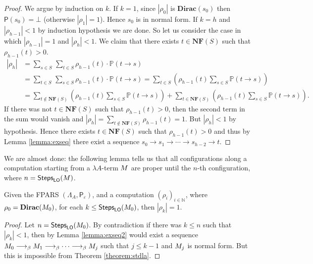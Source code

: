 \begin{proof}
	We argue by induction on $k$. If $k=1$, since $|\rho_0|$ is $\mathbf{Dirac}(s_0)$ then $\mathsf{P}(s_0)=\bot$ (otherwise $|\rho_1|=1$). Hence $s_0$ is in normal form. If $k=h$ and $|\rho_{h-1}|<1$ by induction hypothesis we are done. So let us consider the case in which $|\rho_{h-1}|=1$ and $|\rho_h|<1$. We claim that there exists $t\in \mathbf{NF}(S)$ such that $\rho_{h-1}(t)>0$.
	\begin{align*}
	|\rho_h|&=\underset{s\in S}{\sum}\,\underset{t\in S}{\sum}\rho_{h-1}(t) \cdot\mathbb{P}\left(t \rightarrow s\right)\\
	&=\underset{t\in S}{\sum}\,\underset{s\in S}{\sum}\rho_{h-1}(t) \cdot\mathbb{P}\left(t \rightarrow s\right)=\underset{t\in S}{\sum}\left(\rho_{h-1}(t)\underset{s\in S}{\sum}\mathbb{P}\left(t \rightarrow s\right) \right)\\
	&=\underset{t\not\in \mathbf{NF}(S)}{\sum}\left(\rho_{h-1}(t)\underset{s\in S}{\sum}\mathbb{P}\left(t \rightarrow s\right) \right)+\underset{t\in \mathbf{NF}(S)}{\sum}\left(\rho_{h-1}(t)\underset{s\in S}{\sum}\mathbb{P}\left(t \rightarrow s\right) \right).
	\end{align*}
	If there was not $t\in \mathbf{NF}(S)$ such that $\rho_{h-1}(t)>0$, then the second term in the sum would vanish and
	$|\rho_h|=\underset{t\not\in \mathbf{NF}(S)}{\sum}\rho_{h-1}(t)=1$.
	But $|\rho_h|<1$ by hypothesis. Hence there exists $t\in \mathbf{NF}(S)$ such that $\rho_{h-1}(t)>0$ and thus by Lemma \ref{lemma:exseq} there exist a sequence $s_0\rightarrow s_1\rightarrow\cdots\rightarrow s_{h-2}\rightarrow t$.
\end{proof}
We are almost done: the following lemma tells us that all
configurations along a computation starting from a $\lambda A$-term $M$
are proper until the $n$-th configuration, where
$n=\textsf{Steps}_{\textsf{LO}}(M)$.
\begin{lemma}\label{lemma:min}
	Given the FPARS $(\Lambda_A, \mathsf{P}_\varepsilon)$, and a
	computation $(\rho_i)_{i\in\mathbb{N}}$, where
	$\rho_0=\mathbf{Dirac}(M_0)$, for each
	$k\leq\textsf{Steps}_{\textsf{LO}}(M_0)$, then $|\rho_k|=1$.
\end{lemma}
\begin{proof}
	Let $n=\textsf{Steps}_{\textsf{LO}}(M_0)$. By contradiction if there was $k\leq n$ such that $|\rho_k|<1$, then by Lemma \ref{lemma:exseq2} would exist a sequence $M_0\longrightarrow_\beta M_1\longrightarrow_\beta\cdots\longrightarrow_\beta M_j$ such that $j\leq k-1$ and $M_j$ is normal form. But this is impossible from Theorem \ref{theorem:stdla}.
\end{proof}
